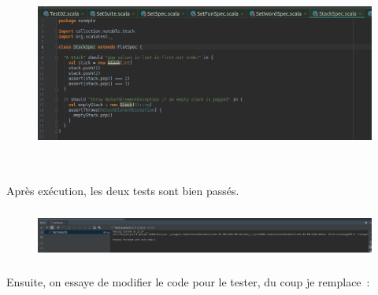 \documentclass[12pt]{article}
\begin{document}

\begin{figure}[H]
	\begin{Center}
		\includegraphics[width=6.3in,height=2.53in]{./media/image26.png}
	\end{Center}
\end{figure}



\par

\begin{justify}
Après exécution, les deux tests sont bien passés.
\end{justify}\par




\begin{figure}[H]
	\begin{Center}
		\includegraphics[width=6.3in,height=0.66in]{./media/image27.png}
	\end{Center}
\end{figure}



\par

\begin{justify}
Ensuite, on essaye de modifier le code pour le tester, du coup je remplace :
\end{justify}\par
\end{document}
